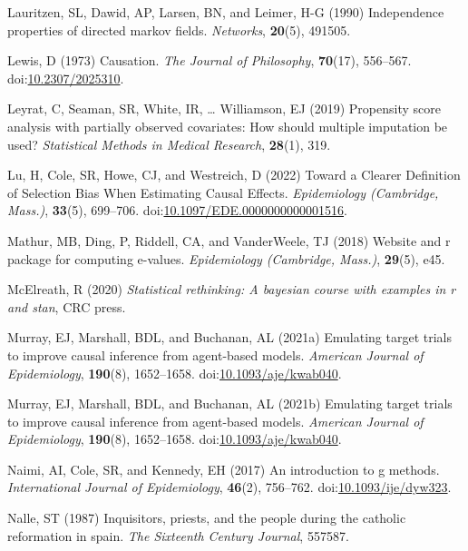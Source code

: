 \documentclass[
  singlecolumn]{article}
\newlength{\cslhangindent}
\newenvironment{CSLReferences}[2] %
 {\begin{list}{}{%
  \setlength{\itemindent}{0pt}
  \setlength{\leftmargin}{0pt}
  \setlength{\parsep}{0pt}
  \ifodd #1
   \setlength{\leftmargin}{\cslhangindent}
   \setlength{\itemindent}{-1\cslhangindent}
  \fi
  \setlength{\itemsep}{#2\baselineskip}}}
 {\end{list}}
\begin{document}
\begin{CSLReferences}{1}{0}
Lauritzen, SL, Dawid, AP, Larsen, BN, and Leimer, H-G (1990)
Independence properties of directed markov fields. \emph{Networks},
\textbf{20}(5), 491505.

Lewis, D (1973) Causation. \emph{The Journal of Philosophy},
\textbf{70}(17), 556--567.
doi:\href{https://doi.org/10.2307/2025310}{10.2307/2025310}.

Leyrat, C, Seaman, SR, White, IR, \ldots{} Williamson, EJ (2019)
Propensity score analysis with partially observed covariates: How should
multiple imputation be used? \emph{Statistical Methods in Medical
Research}, \textbf{28}(1), 319.

Lu, H, Cole, SR, Howe, CJ, and Westreich, D (2022) Toward a Clearer
Definition of Selection Bias When Estimating Causal Effects.
\emph{Epidemiology (Cambridge, Mass.)}, \textbf{33}(5), 699--706.
doi:\href{https://doi.org/10.1097/EDE.0000000000001516}{10.1097/EDE.0000000000001516}.

Mathur, MB, Ding, P, Riddell, CA, and VanderWeele, TJ (2018) Website and
r package for computing e-values. \emph{Epidemiology (Cambridge,
Mass.)}, \textbf{29}(5), e45.

McElreath, R (2020) \emph{Statistical rethinking: A bayesian course with
examples in r and stan}, CRC press.

Murray, EJ, Marshall, BDL, and Buchanan, AL (2021a) Emulating target
trials to improve causal inference from agent-based models.
\emph{American Journal of Epidemiology}, \textbf{190}(8), 1652--1658.
doi:\href{https://doi.org/10.1093/aje/kwab040}{10.1093/aje/kwab040}.

Murray, EJ, Marshall, BDL, and Buchanan, AL (2021b) Emulating target
trials to improve causal inference from agent-based models.
\emph{American Journal of Epidemiology}, \textbf{190}(8), 1652--1658.
doi:\href{https://doi.org/10.1093/aje/kwab040}{10.1093/aje/kwab040}.

Naimi, AI, Cole, SR, and Kennedy, EH (2017) An introduction to g
methods. \emph{International Journal of Epidemiology}, \textbf{46}(2),
756--762.
doi:\href{https://doi.org/10.1093/ije/dyw323}{10.1093/ije/dyw323}.

Nalle, ST (1987) Inquisitors, priests, and the people during the
catholic reformation in spain. \emph{The Sixteenth Century Journal},
557587.


\end{CSLReferences}
\end{document}
